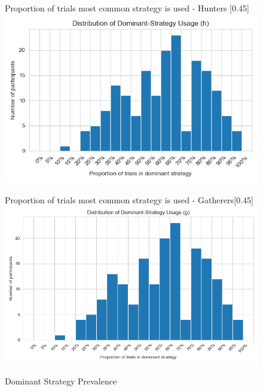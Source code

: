 \documentclass{article}
\begin{document}
     \begin{figure}[H]
          \centering
          \begin{subcaptionbox}{Proportion of trials most common strategy is used - Hunters \label{fig:h1}}[0.45\textwidth]
            {\centering\includegraphics[width=\linewidth]{plots/strategies/dominant_prop_first_visits_area_screen_loc_h.png}}
          \end{subcaptionbox}
          \hfill
          \begin{subcaptionbox}{Proportion of trials most common strategy is used - Gatherers\label{fig:h2}}[0.45\textwidth]
            {\centering\includegraphics[width=\linewidth]{plots/strategies/dominant_prop_first_visits_area_screen_loc_g.png}}
          \end{subcaptionbox}
     \caption{Dominant Strategy Prevalence}
     \label{fig:dom_props}
    \end{figure}
\end{document}
